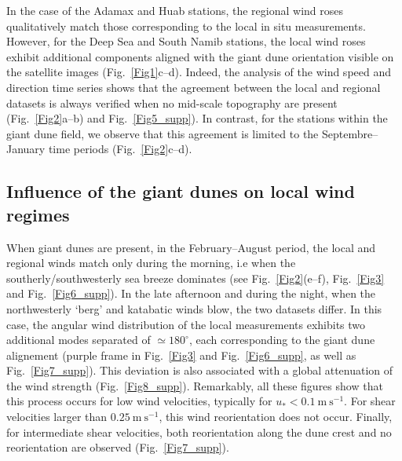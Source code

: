   In the case of the Adamax and Huab stations, the regional wind roses qualitatively match those corresponding to the local in situ measurements. However, for the Deep Sea and South Namib stations, the local wind roses exhibit additional components aligned with the giant dune orientation visible on the satellite images (Fig.~\ref{Fig1}c--d).
  Indeed, the analysis of the wind speed and direction time series shows that the agreement between the local and regional datasets is always verified when no mid-scale topography are present (Fig.~\ref{Fig2}a--b) and Fig.~\ref{Fig5_supp}). In contrast, for the stations within the giant dune field, we observe that this agreement is limited to the Septembre--January time periods (Fig.~\ref{Fig2}c--d).

  \subsection{Influence of the giant dunes on local wind regimes}
  \label{section_data_feedback}

  When giant dunes are present, in the February--August period, the local and regional winds match only during the morning, i.e when the southerly/southwesterly sea breeze dominates (see Fig.~\ref{Fig2}(e--f), Fig.~\ref{Fig3} and Fig.~\ref{Fig6_supp}). In the late afternoon and during the night, when the northwesterly `berg' and katabatic winds blow, the two datasets differ. In this case, the angular wind distribution of the local measurements exhibits two additional modes separated of $\simeq 180^\circ$, each corresponding to the giant dune alignement (purple frame in Fig.~\ref{Fig3} and Fig.~\ref{Fig6_supp}, as well as Fig.~\ref{Fig7_supp}). This deviation is also associated with a global attenuation of the wind strength (Fig.~\ref{Fig8_supp}). Remarkably, all these figures show that this process occurs for low wind velocities, typically for $u_{*} < 0.1~\textrm{m}~\textrm{s}^{-1}$. For shear velocities larger than $0.25~\textrm{m}~\textrm{s}^{-1}$, this wind reorientation does not occur. Finally, for intermediate shear velocities, both reorientation along the dune crest and no reorientation are observed (Fig.~\ref{Fig7_supp}).



